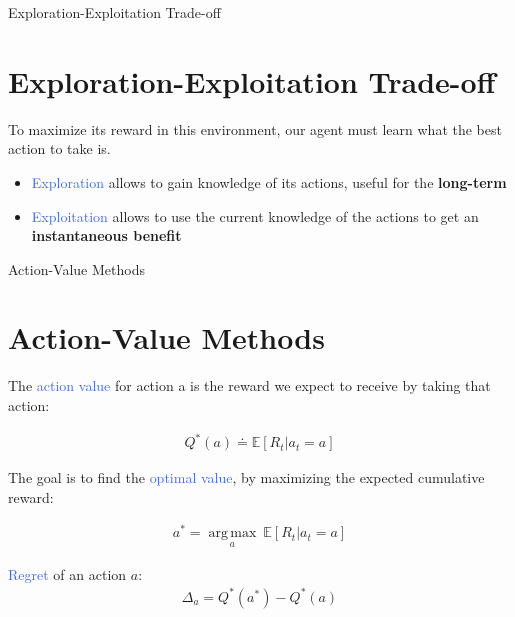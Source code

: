 \documentclass{beamer}
\DeclareMathOperator*{\argmax}{arg\,max}
\begin{document}
\begin{frame}{Exploration-Exploitation Trade-off}
\section{Exploration-Exploitation Trade-off}

To maximize its reward in this environment, our agent must learn what the best action to take is.

\vspace{2mm}
	
\begin{itemize}
    \item \textcolor{RoyalBlue}{Exploration} allows to gain knowledge of its actions, useful for the \textbf{long-term}
   \item \textcolor{RoyalBlue}{Exploitation} allows to use the current knowledge of the actions to get an \textbf{instantaneous benefit}
\end{itemize}

\end{frame}





\begin{frame}{Action-Value Methods}
\section{Action-Value Methods}

The \textcolor{RoyalBlue}{action value} for action a is the reward we expect to receive by taking that action:

\begin{align*}
	Q^{*}(a) \doteq \mathds{E}[R_t|a_t = a]
\end{align*}

The goal is to find the \textcolor{RoyalBlue}{optimal value}, by maximizing the expected cumulative reward:

\begin{align*}
    a^{*} =\underset{a}{\argmax}\:\mathds{E}[R_t|a_t = a]
\end{align*}


\vspace{1mm}

\textcolor{RoyalBlue}{Regret} of an action $a$:
\begin{align*}
    \Delta_a = Q^{*}(a^{*}) - Q^{*}(a)
\end{align*}


\end{frame}
\end{document}
